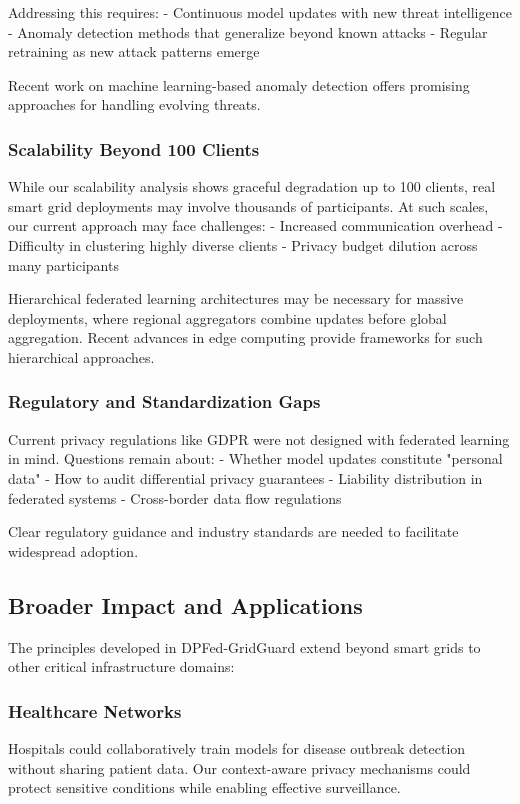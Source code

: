 \documentclass{ieeeaccess}
\theoremstyle{definition}
\begin{document}
Addressing this requires:
- Continuous model updates with new threat intelligence
- Anomaly detection methods that generalize beyond known attacks
- Regular retraining as new attack patterns emerge

Recent work on machine learning-based anomaly detection \cite{ahmad2021anomaly, sida2025research, jing2025multi} offers promising approaches for handling evolving threats.

\subsubsection{Scalability Beyond 100 Clients}

While our scalability analysis shows graceful degradation up to 100 clients, real smart grid deployments may involve thousands of participants. At such scales, our current approach may face challenges:
- Increased communication overhead
- Difficulty in clustering highly diverse clients
- Privacy budget dilution across many participants

Hierarchical federated learning architectures may be necessary for massive deployments, where regional aggregators combine updates before global aggregation. Recent advances in edge computing \cite{li2025federated, anand2024enhancing} provide frameworks for such hierarchical approaches.

\subsubsection{Regulatory and Standardization Gaps}

Current privacy regulations like GDPR were not designed with federated learning in mind. Questions remain about:
- Whether model updates constitute "personal data"
- How to audit differential privacy guarantees
- Liability distribution in federated systems
- Cross-border data flow regulations

Clear regulatory guidance and industry standards are needed to facilitate widespread adoption.

\subsection{Broader Impact and Applications}

The principles developed in DPFed-GridGuard extend beyond smart grids to other critical infrastructure domains:

\subsubsection{Healthcare Networks}
Hospitals could collaboratively train models for disease outbreak detection without sharing patient data. Our context-aware privacy mechanisms could protect sensitive conditions while enabling effective surveillance.
\end{document}

